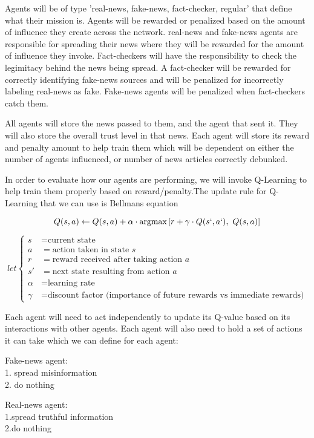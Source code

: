 \documentclass[twoside]{article}
\begin{document}
Agents will be of type 'real-news, fake-news, fact-checker, regular' that define what their mission is. Agents will be rewarded or penalized based on the amount of influence they create across the network. real-news and fake-news agents are responsible for spreading their news where they will be rewarded for the amount of influence they invoke. Fact-checkers will have the responsibility to check the legimitacy behind the news being spread. A fact-checker will be rewarded for correctly identifying fake-news sources and will be penalized for incorrectly labeling real-news as fake. Fake-news agents will be penalized when fact-checkers catch them.

All agents will store the news passed to them, and the agent that sent it. They will also store the overall trust level in that news. Each agent will store its reward and penalty amount to help train them which will be dependent on either the number of agents influenced, or number of news articles correctly debunked.

In order to evaluate how our agents are performing, we will invoke Q-Learning to help train them properly based on reward/penalty.The update rule for Q-Learning that we can use is Bellmans equation 

\[Q(s, a) \leftarrow Q(s, a) + \alpha \cdot  \text{argmax}\left[r + \gamma \cdot Q(s`, a`), \,\,Q(s, a) \right]\]

\[
let \left\{
\begin{aligned}
s & = \text{current state} \\
a & = \text{action taken in state } s \\
r & = \text{reward received after taking action } a \\
s' & = \text{next state resulting from action } a \\
\alpha & = \text{learning rate} \\
\gamma & = \text{discount factor (importance of future rewards vs immediate rewards)}
\end{aligned}
\right.
\]

Each agent will need to act independently to update its Q-value based on its interactions with other agents. Each agent will also need to hold a set of actions it can take which we can define for each agent:

Fake-news agent:\\
1. spread misinformation\\
2. do nothing

Real-news agent:\\
1.spread truthful information\\
2.do nothing
\end{document}
